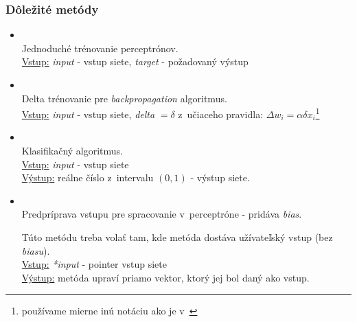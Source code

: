 \subsubsection{Dôležité metódy}
\begin{itemize}
\item {}
\\Jednoduché trénovanie perceptrónov.
\\ \underline{Vstup:} \textit{input} - vstup siete, \textit{target} - požadovaný výstup 
\item {}
\\Delta trénovanie pre \textit{backpropagation} algoritmus.
\\ \underline{Vstup:} \textit{input} - vstup siete, \textit{delta} $=\delta$ z~učiaceho pravidla: $\Delta w_i = \alpha\delta x_i$\footnote{používame mierne inú notáciu ako je v~\cite{haykin1999neural}} \cite[s. 74]{haykin1999neural}
\item {}
\\Klasifikačný algoritmus.
\\ \underline{Vstup:} \textit{input} - vstup siete
\\ \underline{Výstup:} reálne číslo z~intervalu $(0,1)$ - výstup siete.
\item {}
\\Predpríprava vstupu pre spracovanie v~perceptróne - pridáva \textit{bias}.

Túto metódu treba volať tam, kde metóda dostáva užívateľský vstup (bez \textit{biasu}).
\\ \underline{Vstup:} \textit{*input} - pointer vstup siete
\\ \underline{Výstup:} metóda upraví priamo vektor, ktorý jej bol daný ako vstup.
\end{itemize}


